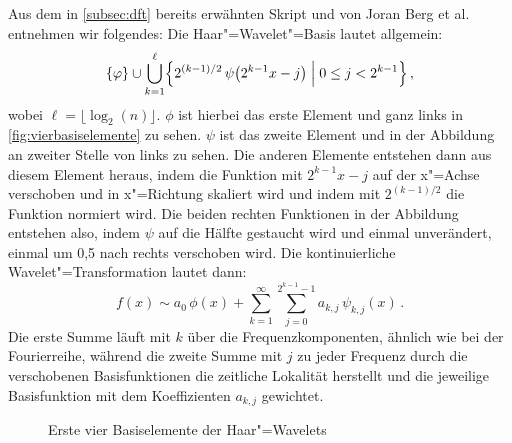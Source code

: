 Aus dem in \autoref{subsec:dft} bereits erwähnten Skript und von Joran Berg et al. \cite{wavelets} entnehmen wir folgendes: Die Haar"=Wavelet"=Basis lautet allgemein: \[ \{\phi\} \cup \bigcup_{k=1}^\ell \Bigl\{ 2^{(k-1)/2} \, \psi \bigl( 2^{k-1} x - j \bigr) \Bigm| 0 \leq j < 2^{k-1} \Bigr\} \,, \]
wobei $\ell=\lfloor \log_2(n) \rfloor$. $\phi$ ist hierbei das erste Element und ganz links in \autoref{fig:vierbasiselemente} zu sehen. $\psi$ ist das zweite Element und in der Abbildung an zweiter Stelle von links zu sehen. Die anderen Elemente entstehen dann aus diesem Element heraus, indem die Funktion mit $2^{k-1}x-j$ auf der x"=Achse verschoben und in x"=Richtung skaliert wird und indem mit $2^{(k-1)/2}$ die Funktion normiert wird. Die beiden rechten Funktionen in der Abbildung entstehen also, indem $\psi$ auf die Hälfte gestaucht wird und einmal unverändert, einmal um 0,5 nach rechts verschoben wird. Die kontinuierliche Wavelet"=Transformation lautet dann: \[f(x) \sim a_0 \, \phi(x) + \sum_{k=1}^\infty \sum_{j=0}^{2^{k-1}-1} a_{k,j} \, \psi_{k,j}(x) \,.\] Die erste Summe läuft mit $k$ über die Frequenzkomponenten, ähnlich wie bei der Fourierreihe, während die zweite Summe mit $j$ zu jeder Frequenz durch die verschobenen Basisfunktionen die zeitliche Lokalität herstellt und die jeweilige Basisfunktion mit dem Koeffizienten $a_{k,j}$ gewichtet.
\begin{figure}[h]
  \hfill%
  \hfill%
  \hfill%
  \caption{Erste vier Basiselemente der Haar"=Wavelets}
\end{figure}\label{fig:vierbasiselemente}
\renewcommand{\waveletfunction}[1]{%
 \begin{tikzpicture}[x = 20mm, y = 20mm]
  \useasboundingbox (-0.45, -1.5) rectangle (1.2, 1.7);
  \draw [->] (-0.1, 0) -- (1.2, 0);
  \draw [->] (0, -1.5) -- (0, 1.7);
  \tikztextr{1.2}{0.15}{$x$}
  \tikztextl{0.075}{1.65}{$y$}
  \tikztextc{0}{-0.15}{$0$}
  \tikztextc{0.5}{-0.15}{$0{,}5\ell$}
  \tikztextc{1}{-0.15}{$\ell$}
  \tikztextr{-0.075}{-1}{$-c$}
  \tikztextr{-0.075}{1}{$c$}
  \draw [blue, thick] (-0.05, 0) -| #1 -- (1.05, 0);
 \end{tikzpicture}%
}

